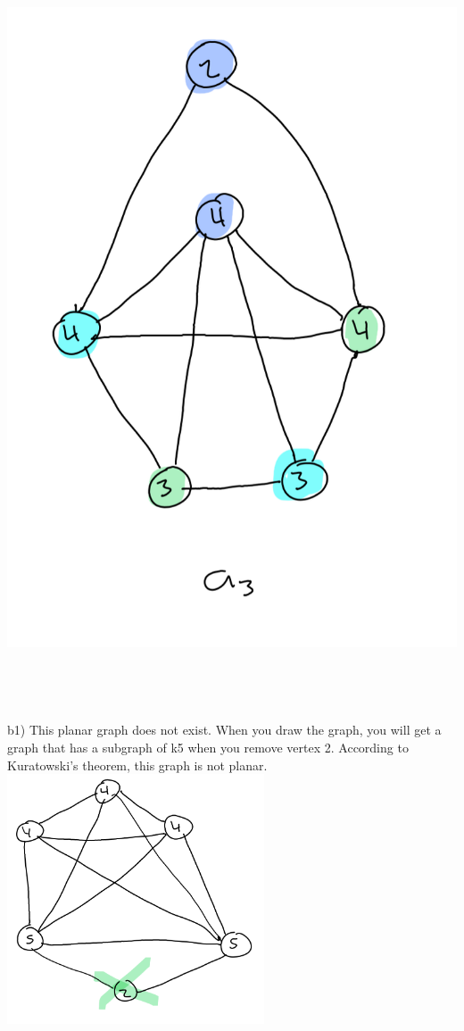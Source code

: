 \documentclass{article}
\begin{document}
\begin{solution}
	\\ \includegraphics[scale=0.5]{a3.png}
	\\\\\\\\\\
	b1) This planar graph does not exist. When you draw the graph, you will get a graph that has a subgraph of k5 when you remove vertex 2. According to Kuratowski's theorem, this graph is not planar.
	\\ \includegraphics[width=3in]{b1.png}

\end{solution}
\end{document}
